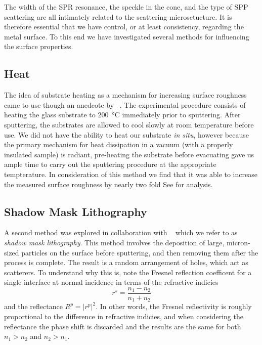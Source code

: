 The width of the SPR resonance, the speckle in the cone, and the type of
SPP scattering are all intimately related to the scattering microsctucture.
It is therefore essential that we have control, or at least consistency,
regarding the metal surface.  To this end we have investigated several
methods for influencing the surface properties.  

\subsection{Heat}
The idea of substrate heating as a mechanism for increasing surface
roughness came to use though an anedcote by
~\cite{horstmann1977multiple}.  The experimental procedure
consists of heating the glass substrate to \SI{200}{\celsius} immediately
prior to sputtering.  After sputtering, the substrates are allowed to cool
slowly at room temperature before use.  We did not have the ability to heat
our substrate \textit{in situ}, however because the primary mechanism for
heat dissipation in a vacuum (with a properly insulated sample) is radiant,
pre-heating the substrate before evacuating gave us ample time to carry out
the sputtering procedure at the appropriate tempterature.  In consideration
of this method we find that it was able to increase the measured surface
roughness by nearly two fold See  for analysis.

\subsection{Shadow Mask Lithography}
A second method was explored in collaboration with
~\cite{huang2014speckle} which we refer to as \textit{shadow
mask lithography}.  This method involves the deposition of large,
micron-sized particles on the surface before sputtering, and then removing
them after the process is complete.  The result is a random arrangement of
holes, which act as scatterers.  To understand why this is, note the
Fresnel reflection coefficent for a single interface at normal incidence in
terms of the refractive indicies
\begin{equation}
r^s = \frac{n_1 - n_2}{n_1+n_2}
\end{equation}
and the reflectance $R^p=|r^p|^2$.  In other words, the Fresnel
reflectivity is
roughly proportional to the difference in refractive indicies, and when
considering the reflectance the phase shift is discarded and the results
are the same for both $n_1>n_2$ and $n_2>n_1$.

